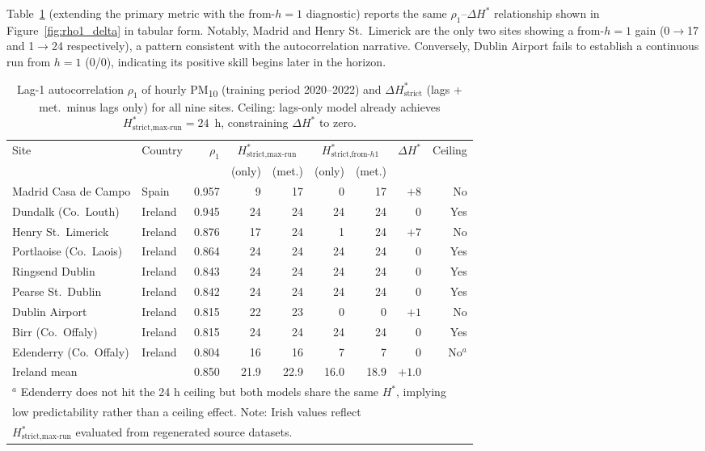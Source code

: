 \documentclass[12pt,a4paper]{article}
\newcommand{\PMten}{PM\textsubscript{10}}
\begin{document}
Table~\ref{tab:rho1} (extending the primary metric with the from-$h{=}1$ diagnostic) reports the same $\rho_1$--$\Delta H^*$ relationship shown in Figure~\ref{fig:rho1_delta} in tabular form. Notably, Madrid and Henry St.\ Limerick are the only two sites showing a from-$h{=}1$ gain (0$\to$17 and 1$\to$24 respectively), a pattern consistent with the autocorrelation narrative. Conversely, Dublin Airport fails to establish a continuous run from $h{=}1$ (0/0), indicating its positive skill begins later in the horizon.

\begin{table}[htbp]
\centering
\caption{Lag-1 autocorrelation $\rho_1$ of hourly \PMten{} (training period
  2020--2022) and $\Delta H^*_{\text{strict}}$ (lags + met.\ minus lags only)
  for all nine sites.  Ceiling: lags-only model already achieves
  $H^*_{\text{strict,max-run}} = 24$~h, constraining $\Delta H^*$ to zero.}
\label{tab:rho1}
\small
\begin{tabular}{llrrrrrrr}
\toprule
Site & Country & $\rho_1$ &
\multicolumn{2}{c}{$H^*_{\text{strict,max-run}}$} &
\multicolumn{2}{c}{$H^*_{\text{strict,from-}h1}$} &
$\Delta H^*$ & Ceiling \\
\cmidrule(lr){4-5} \cmidrule(lr){6-7}
& & & (only) & (met.) & (only) & (met.) & & \\
\midrule
Madrid Casa de Campo     & Spain   & 0.957 &  9 & 17 &  0 & 17 & $+8$ & No \\
Dundalk (Co.\ Louth)     & Ireland & 0.945 & 24 & 24 & 24 & 24 &  0   & Yes \\
Henry St.\ Limerick      & Ireland & 0.876 & 17 & 24 &  1 & 24 & $+7$ & No \\
Portlaoise (Co.\ Laois)  & Ireland & 0.864 & 24 & 24 & 24 & 24 &  0   & Yes \\
Ringsend Dublin          & Ireland & 0.843 & 24 & 24 & 24 & 24 &  0   & Yes \\
Pearse St.\ Dublin       & Ireland & 0.842 & 24 & 24 & 24 & 24 &  0   & Yes \\
Dublin Airport           & Ireland & 0.815 & 22 & 23 &  0 &  0 & $+1$ & No \\
Birr (Co.\ Offaly)       & Ireland & 0.815 & 24 & 24 & 24 & 24 &  0   & Yes \\
Edenderry (Co.\ Offaly)  & Ireland & 0.804 & 16 & 16 &  7 &  7 &  0   & No$^a$ \\
\midrule
Ireland mean             &         & 0.850 & 21.9 & 22.9 & 16.0 & 18.9 & $+1.0$ & \\
\bottomrule
\multicolumn{9}{l}{$^a$ Edenderry does not hit the 24 h ceiling but both
  models share the same $H^*$, implying}\\
\multicolumn{9}{l}{\phantom{$^a$} low predictability rather than a ceiling
  effect. Note: Irish values reflect}\\
\multicolumn{9}{l}{\phantom{$^a$} $H^*_{\text{strict,max-run}}$ evaluated from regenerated source datasets.}
\end{tabular}
\end{table}
\end{document}
